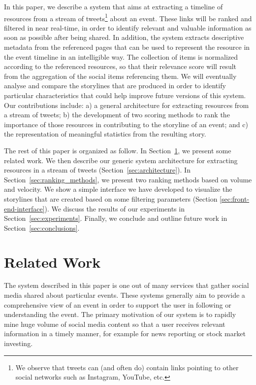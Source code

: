\documentclass{sig-alternate-somus}
\begin{document}
In this paper, we describe a system that aims at extracting a timeline of resources from a stream of tweets\footnote{We observe that tweets can (and often do) contain links pointing to other social networks such as Instagram, YouTube, etc.} about an event. These links will be ranked and filtered in near real-time, in order to identify relevant and valuable information as soon as possible after being shared. In addition, the system extracts descriptive metadata from the referenced pages that can be used to represent the resource in the event timeline in an intelligible way. The collection of items is normalized according to the referenced resources, so that their relevance score will result from the aggregation of the social items referencing them. We will eventually analyse and compare the storylines that are produced in order to identify particular characteristics that could help improve future versions of this system. Our contributions include: a) a general architecture for extracting resources from a stream of tweets; b) the development of two scoring methods to rank the importance of those resources in contributing to the storyline of an event; and c) the representation of meaningful statistics from the resulting story.

The rest of this paper is organized as follow. In Section~\ref{sec:related-work}, we present some related work. We then describe our generic system architecture for extracting resources in a stream of tweets (Section~\ref{sec:architecture}). In Section~\ref{sec:ranking_methods}, we present two ranking methods based on volume and velocity. We show a simple interface we have developed to visualize the storylines that are created based on some filtering parameters (Section \ref{sec:front-end-interface}). We discuss the results of our experiments in Section~\ref{sec:experiments}. Finally, we conclude and outline future work in Section~\ref{sec:conclusions}.


\section{Related Work}
\label{sec:related-work}
The system described in this paper is one out of many services that gather social media shared about particular events. These systems generally aim to provide a comprehensive view of an event in order to support the user in following or understanding the event. The primary motivation of our system is to rapidly mine huge volume of social media content so that a user receives relevant information in a timely manner, for example for news reporting or stock market investing.
\end{document}
